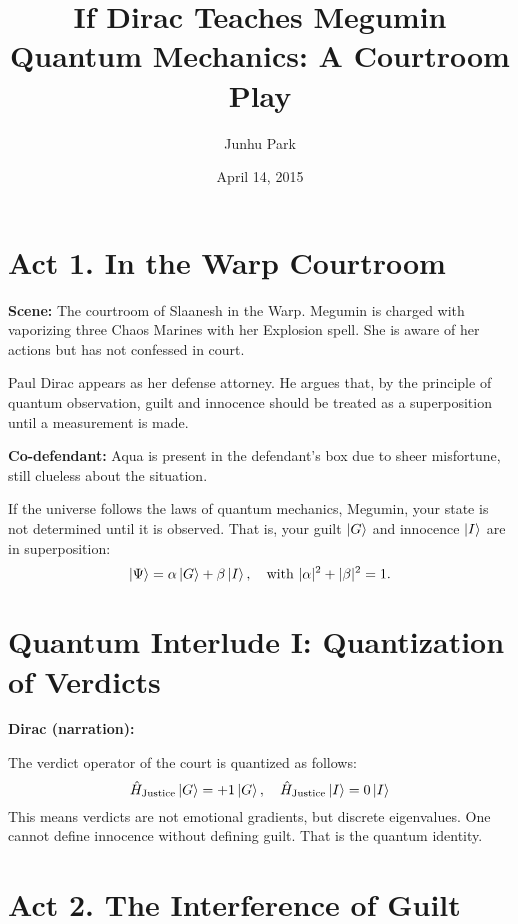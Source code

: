 \documentclass[12pt]{article}
\title{\textbf{If Dirac Teaches Megumin Quantum Mechanics: A Courtroom Play}}
\author{Junhu Park}
\date{April 14, 2015}
\begin{document}
\maketitle

\section*{Act 1. In the Warp Courtroom}

\textbf{Scene:} The courtroom of Slaanesh in the Warp\cite{SlaaneshWikipedia}.  
Megumin\cite{MeguminWikipedia} is charged with vaporizing three Chaos Marines with her Explosion spell.  
She is aware of her actions but has not confessed in court.

Paul Dirac\cite{DiracWikipedia} appears as her defense attorney.  
He argues that, by the principle of quantum observation\cite{neumann1955mathematical}, guilt and innocence should be treated as a superposition until a measurement is made.

\textbf{Co-defendant:}  
Aqua\cite{AquaWikipedia} is present in the defendant's box due to sheer misfortune, still clueless about the situation.

\begin{tcolorbox}[title=Dirac:]
If the universe follows the laws of quantum mechanics\cite{dirac1981principles,griffiths2018introduction}, Megumin, your state is not determined until it is observed. That is, your guilt $\ket{G}$ and innocence $\ket{I}$ are in superposition:
\[
\ket{\Psi} = \alpha \ket{G} + \beta \ket{I}, \quad \text{with } |\alpha|^2 + |\beta|^2 = 1.
\]
\end{tcolorbox}

\section*{Quantum Interlude I: Quantization of Verdicts}

\textbf{Dirac (narration):}

The verdict operator of the court is quantized\cite{nielsen2010quantum} as follows:
\[
\hat{H}_{\text{Justice}} \ket{G} = +1 \ket{G}, \quad \hat{H}_{\text{Justice}} \ket{I} = 0 \ket{I}
\]
This means verdicts are not emotional gradients, but discrete eigenvalues. One cannot define innocence without defining guilt. That is the quantum identity\cite{dirac1981principles}.

\section*{Act 2. The Interference of Guilt}
\end{document}
